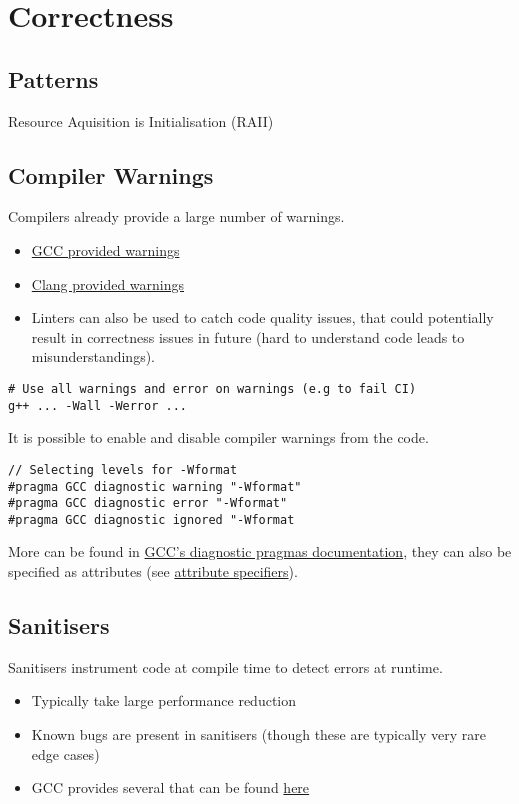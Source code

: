 \section{Correctness}

\subsection{Patterns}
\begin{definitionbox}{Resource Aquisition is Initialisation (RAII)}
    \unfinished
\end{definitionbox}


\subsection{Compiler Warnings}
Compilers already provide a large number of warnings.
\begin{itemize}
    \item \href{https://gcc.gnu.org/onlinedocs/gcc/Warning-Options.html}{GCC provided warnings}
    \item \href{https://clang.llvm.org/docs/DiagnosticsReference.html}{Clang provided warnings}
    \item Linters can also be used to catch code quality issues, that could potentially result in correctness issues in future (hard to understand code leads to misunderstandings).
\end{itemize}
\begin{verbatim}
# Use all warnings and error on warnings (e.g to fail CI)
g++ ... -Wall -Werror ...
\end{verbatim}
It is possible to enable and disable compiler warnings from the code.
\begin{verbatim}
// Selecting levels for -Wformat
#pragma GCC diagnostic warning "-Wformat"
#pragma GCC diagnostic error "-Wformat"
#pragma GCC diagnostic ignored "-Wformat
\end{verbatim}
More can be found in \href{https://gcc.gnu.org/onlinedocs/gcc/Diagnostic-Pragmas.html}{GCC's diagnostic pragmas documentation}, they can also be specified as attributes (see \href{https://en.cppreference.com/w/cpp/language/attributes}{attribute specifiers}).

\subsection{Sanitisers}
Sanitisers instrument code at compile time to detect errors at runtime.
\begin{itemize}
    \item Typically take large performance reduction
    \item Known bugs are present in sanitisers (though these are typically very rare edge cases)
    \item GCC provides several that can be found \href{https://gcc.gnu.org/onlinedocs/gcc/Instrumentation-Options.html}{here}
\end{itemize}


